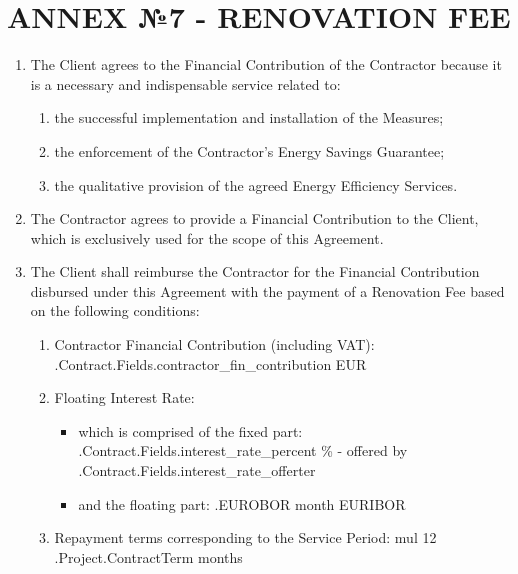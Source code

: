 \section{ANNEX №7 {-} RENOVATION FEE}

\begin{enumerate}[label=\arabic*.]
	\item The Client agrees to the Financial Contribution of the Contractor because it is a necessary and indispensable service related to:
	\begin{enumerate}
		\item the successful implementation and installation of the Measures;
		\item the enforcement of the Contractor’s Energy Savings Guarantee;
		\item the qualitative provision of the agreed Energy Efficiency Services.
	\end{enumerate}

	\item The Contractor agrees to provide a Financial Contribution to the Client, which is exclusively used for the scope of this Agreement.

	\item The Client shall reimburse the Contractor for the Financial Contribution disbursed under this Agreement with the payment of a Renovation Fee based on the following conditions:
	  \begin{enumerate}
		\item Contractor Financial Contribution (including VAT): \iffalse input fields.contractor_fin_contribution value="{{.Contract.Fields.contractor_fin_contribution}}" \fi {{.Contract.Fields.contractor_fin_contribution}} EUR
		\item Floating Interest Rate:
			\begin{itemize}
				\item which is comprised of the fixed part: \iffalse input fields.interest_rate_percent value="{{.Contract.Fields.interest_rate_percent}}" \fi {{.Contract.Fields.interest_rate_percent}} \% {-} offered by \iffalse input fields.interest_rate_offerter value="{{.Contract.Fields.interest_rate_offerter}}" \fi {{.Contract.Fields.interest_rate_offerter}}
				\item and the floating part: {{.EUROBOR}} month EURIBOR
			\end{itemize}
		\item Repayment terms corresponding to the Service Period: {{mul 12 .Project.ContractTerm}} months
	\end{enumerate}


\end{enumerate}
